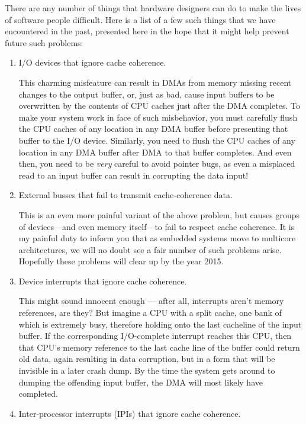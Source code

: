 There are any number of things that hardware designers can do
to make the lives of software people difficult.
Here is a list of a few such things that we have encountered in
the past, presented here in the hope that it might help prevent
future such problems:
\begin{enumerate}
\item	I/O devices that ignore cache coherence.

	This charming misfeature can result in DMAs from memory
	missing recent changes to the output buffer, or, just as
	bad, cause input buffers to be overwritten by the contents
	of CPU caches just after the DMA completes.
	To make your system work in face of such misbehavior,
	you must carefully flush the CPU caches of any location
	in any DMA buffer before presenting that buffer to the
	I/O device.
	Similarly, you need to flush the CPU caches of any location
	in any DMA buffer after DMA to that buffer completes.
	And even then, you need to be \emph{very} careful to avoid
	pointer bugs, as even a misplaced read to an input buffer
	can result in corrupting the data input!

\item	External busses that fail to transmit cache-coherence data.

	This is an even more painful variant of the above problem,
	but causes groups of devices---and even memory itself---to
	fail to respect cache coherence.
	It is my painful duty to inform you that as embedded systems
	move to multicore architectures, we will no doubt see a fair
	number of such problems arise.
	Hopefully these problems will clear up by the year 2015.

\item	Device interrupts that ignore cache coherence.

	This might sound innocent enough --- after all, interrupts
	aren't memory references, are they?
	But imagine a CPU with a split cache, one bank of which is
	extremely busy, therefore holding onto the last cacheline
	of the input buffer.
	If the corresponding I/O-complete interrupt reaches this
	CPU, then that CPU's memory reference to the last cache
	line of the buffer could return old data, again resulting
	in data corruption, but in a form that will be invisible
	in a later crash dump.
	By the time the system gets around to dumping the offending
	input buffer, the DMA will most likely have completed.

\item	Inter-processor interrupts (IPIs) that ignore cache coherence.


\end{enumerate}
